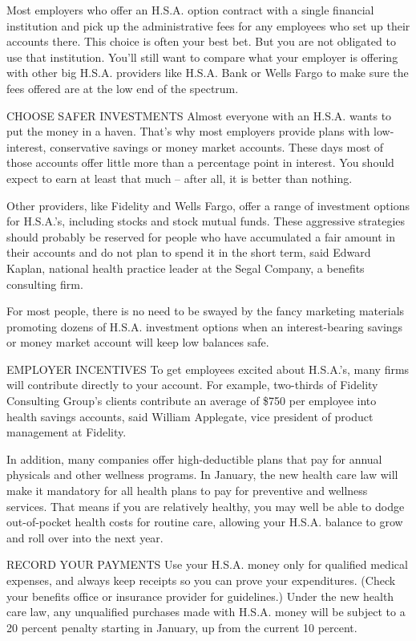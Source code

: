 ﻿\documentclass[12pt]{article}
\begin{document}
Most employers who offer an H.S.A. option contract with a single financial institution and pick up
the administrative fees for any employees who set up their accounts there. This choice is often your
best bet. But you are not obligated to use that institution. You'll still want to compare what your
employer is offering with other big H.S.A. providers like H.S.A. Bank or Wells Fargo to make sure
the fees offered are at the low end of the spectrum.

CHOOSE SAFER INVESTMENTS Almost everyone with an H.S.A. wants to put the money in a haven. That's
why most employers provide plans with low-interest, conservative savings or money market accounts.
These days most of those accounts offer little more than a percentage point in interest. You should
expect to earn at least that much -- after all, it is better than nothing.

Other providers, like Fidelity and Wells Fargo, offer a range of investment options for H.S.A.'s,
including stocks and stock mutual funds. These aggressive strategies should probably be reserved for
people who have accumulated a fair amount in their accounts and do not plan to spend it in the short
term, said Edward Kaplan, national health practice leader at the Segal Company, a benefits
consulting firm.

For most people, there is no need to be swayed by the fancy marketing materials promoting dozens of
H.S.A. investment options when an interest-bearing savings or money market account will keep low
balances safe.

EMPLOYER INCENTIVES To get employees excited about H.S.A.'s, many firms will contribute directly to
your account. For example, two-thirds of Fidelity Consulting Group's clients contribute an average
of \$750 per employee into health savings accounts, said William Applegate, vice president of
product management at Fidelity.

In addition, many companies offer high-deductible plans that pay for annual physicals and other
wellness programs. In January, the new health care law will make it mandatory for all health plans
to pay for preventive and wellness services. That means if you are relatively healthy, you may well
be able to dodge out-of-pocket health costs for routine care, allowing your H.S.A. balance to grow
and roll over into the next year.

RECORD YOUR PAYMENTS Use your H.S.A. money only for qualified medical expenses, and always keep
receipts so you can prove your expenditures. (Check your benefits office or insurance provider for
guidelines.) Under the new health care law, any unqualified purchases made with H.S.A. money will be
subject to a 20 percent penalty starting in January, up from the current 10 percent.
\end{document}
